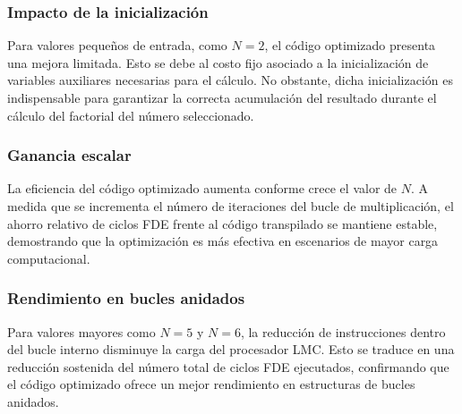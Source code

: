 \documentclass[12pt,a4paper]{article}
\begin{document}
\begin{itemize}
\subsubsection{Impacto de la inicialización}

Para valores pequeños de entrada, como $N = 2$, el código optimizado presenta una mejora limitada.
Esto se debe al costo fijo asociado a la inicialización de variables auxiliares necesarias para el cálculo.
No obstante, dicha inicialización es indispensable para garantizar la correcta acumulación del resultado
durante el cálculo del factorial del número seleccionado.

\subsubsection{Ganancia escalar}

La eficiencia del código optimizado aumenta conforme crece el valor de $N$.
A medida que se incrementa el número de iteraciones del bucle de multiplicación,
el ahorro relativo de ciclos FDE frente al código transpilado se mantiene estable,
demostrando que la optimización es más efectiva en escenarios de mayor carga computacional.

\subsubsection{Rendimiento en bucles anidados}

Para valores mayores como $N = 5$ y $N = 6$, la reducción de instrucciones dentro del bucle interno
disminuye la carga del procesador LMC.
Esto se traduce en una reducción sostenida del número total de ciclos FDE ejecutados,
confirmando que el código optimizado ofrece un mejor rendimiento en estructuras de bucles anidados.

\end{itemize}
\end{document}
